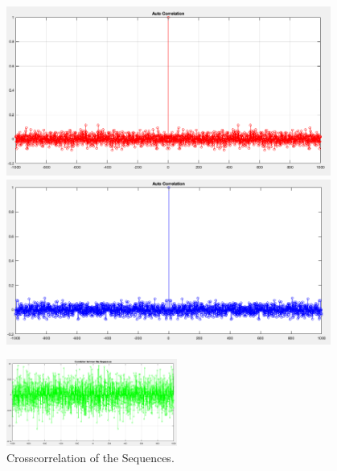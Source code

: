 \documentclass[12pt]{article}
\begin{document}
    \begin{figure}[H]
      \centering
      \begin{minipage}{0.5\textwidth}
        \centering
        \includegraphics[width=0.95\textwidth]{seq1_1000_xcorr.png}
      \end{minipage}%
      \begin{minipage}{0.5\textwidth}
        \centering
        \includegraphics[width=0.95\textwidth]{seq2_1000_xcorr.png}
      \end{minipage}
    \end{figure}

    \begin{figure}[H]
      \centering
      \includegraphics[width=0.5\textwidth]{xcorr_1000.png}
      \caption{Crosscorrelation of the Sequences.}
    \end{figure}
\end{document}
